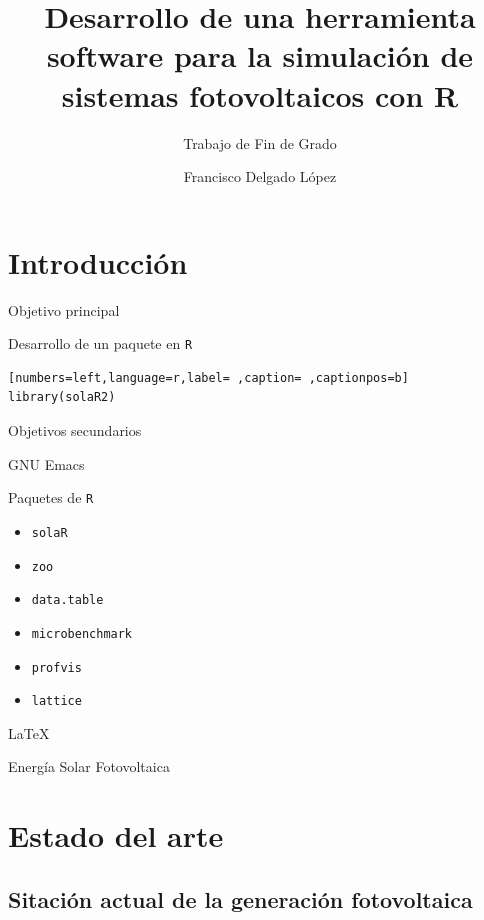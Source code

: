 \documentclass[aspectratio=169, usenames,svgnames,dvipsnames]{beamer}
\author{Francisco Delgado López}
\date{}
\title{Desarrollo de una herramienta software para la simulación de sistemas fotovoltaicos con R}
\subtitle{Trabajo de Fin de Grado}
\institute[UPM]{Universidad Politécnica de Madrid}
\begin{document}
\maketitle

\section{Introducción}
\label{sec:orgacaf42f}
\begin{frame}[label={sec:orge944fb0},fragile]{Objetivo principal}
 \begin{block}{Desarrollo de un paquete en \texttt{R}}
\begin{lstlisting}[numbers=left,language=r,label= ,caption= ,captionpos=b]
library(solaR2)
\end{lstlisting}
\end{block}
\end{frame}

\begin{frame}[label={sec:orgbb463f5},fragile]{Objetivos secundarios}
 \begin{block}{GNU Emacs}
\end{block}
\begin{block}{Paquetes de \texttt{R}}
\begin{itemize}
\item \texttt{solaR}
\item \texttt{zoo}
\item \texttt{data.table}
\item \texttt{microbenchmark}
\item \texttt{profvis}
\item \texttt{lattice}
\end{itemize}
\end{block}
\begin{block}{\LaTeX{}}
\end{block}
\begin{block}{Energía Solar Fotovoltaica}
\end{block}
\end{frame}

\section{Estado del arte}
\label{sec:org2bded65}
\subsection{Sitación actual de la generación fotovoltaica}
\label{sec:org1604831}
\end{document}
